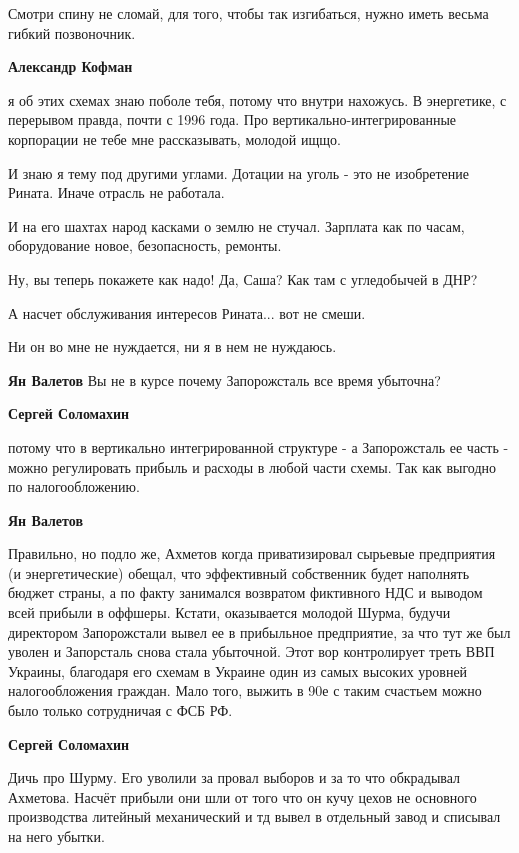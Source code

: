 \begin{itemize}
Смотри спину не сломай, для того, чтобы так изгибаться, нужно иметь весьма
гибкий позвоночник.

\begin{itemize} %
\textbf{Александр Кофман} 

я об этих схемах знаю поболе тебя, потому что внутри нахожусь. В энергетике, с
перерывом правда, почти с 1996 года. Про вертикально-интегрированные корпорации
не тебе мне рассказывать, молодой ищщо.

И знаю я тему под другими углами. Дотации на уголь - это не изобретение Рината.
Иначе отрасль не работала.

И на его шахтах народ касками о землю не стучал. Зарплата как по часам,
оборудование новое, безопасность, ремонты.

Ну, вы теперь покажете как надо! Да, Саша? Как там с угледобычей в ДНР?

А насчет обслуживания интересов Рината... вот не смеши.

Ни он во мне не нуждается, ни я в нем не нуждаюсь.

\textbf{Ян Валетов} Вы не в курсе почему Запорожсталь все время убыточна?

\textbf{Сергей Соломахин} 

потому что в вертикально интегрированной структуре - а Запорожсталь ее часть -
можно регулировать прибыль и расходы в любой части схемы. Так как выгодно по
налогообложению.

\textbf{Ян Валетов} 

Правильно, но подло же, Ахметов когда приватизировал сырьевые предприятия (и
энергетические) обещал, что эффективный собственник будет наполнять бюджет
страны, а по факту занимался возвратом фиктивного НДС и выводом всей прибыли в
оффшеры. Кстати, оказывается молодой Шурма, будучи директором Запорожстали
вывел ее в прибыльное предприятие, за что тут же был уволен и Запорсталь снова
стала убыточной. Этот вор контролирует треть ВВП Украины, благодаря его схемам
в Украине один из самых высоких уровней налогообложения граждан. Мало того,
выжить в 90е с таким счастьем можно было только сотрудничая с ФСБ РФ.

\textbf{Сергей Соломахин} 

Дичь про Шурму. Его уволили за провал выборов и за то что обкрадывал Ахметова.
Насчёт прибыли они шли от того что он кучу цехов не основного производства
литейный механический и тд вывел в отдельный завод и списывал на него убытки.


\end{itemize}
\end{itemize}

